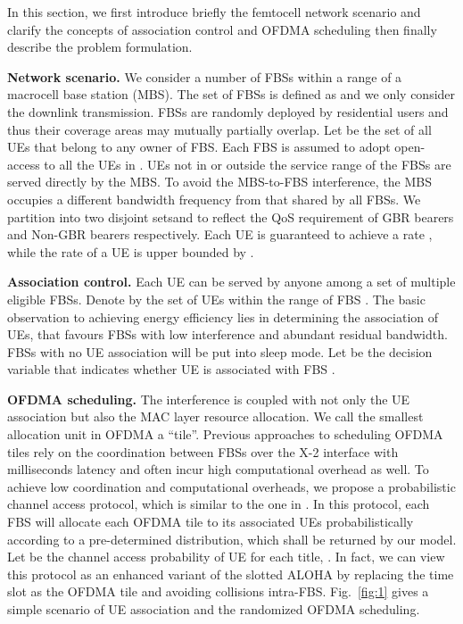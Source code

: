 \documentclass[conference]{IEEEtran}
\begin{document}
In this section, we first introduce briefly the femtocell network scenario and clarify the concepts of association control and OFDMA scheduling then finally describe the problem formulation.

\noindent\textbf{Network scenario.} We consider a number of FBSs within a range of a macrocell base station (MBS). The set of FBSs is defined as  and we only consider the downlink transmission. FBSs are randomly deployed by residential users and thus their coverage areas may mutually partially overlap. Let  be the set of all UEs that belong to any owner of FBS. Each FBS is assumed to adopt open-access to all the UEs in . UEs not in  or outside the service range of the FBSs are served directly by the MBS. To avoid the MBS-to-FBS interference, the MBS occupies a different bandwidth frequency from that shared by all FBSs. We partition  into two disjoint sets\footnotemark  and  to reflect the QoS requirement of GBR bearers and Non-GBR bearers respectively. Each UE  is guaranteed to achieve a rate , while the rate of a UE  is upper bounded by  \cite{sesia2009lte}.


\noindent\textbf{Association control.} Each UE  can be served by anyone among a set of multiple eligible FBSs. Denote by  the set of UEs within the range of FBS . The basic observation to achieving energy efficiency lies in determining the association of UEs, that favours FBSs with low interference and abundant residual bandwidth. FBSs with no UE association will be put into sleep mode. Let  be the decision variable that indicates whether UE  is associated with FBS . 

\noindent\textbf{OFDMA scheduling.} The interference is coupled with not only the UE association but also the MAC layer resource allocation. We call the smallest allocation unit in OFDMA a ``tile''. Previous approaches \cite{hou2013energy} to scheduling OFDMA tiles rely on the coordination between FBSs over the X-2 interface with milliseconds latency and often incur high computational overhead as well. To achieve low coordination and computational overheads, we propose a probabilistic channel access protocol, which is similar to the one in \cite{hou2011proportionally}. In this protocol, each FBS will allocate each OFDMA tile to its associated UEs probabilistically according to a pre-determined distribution, which shall be returned by our model. Let  be the channel access probability of UE  for each title, . In fact, we can view this protocol as an enhanced variant of the slotted ALOHA by replacing the time slot as the OFDMA tile and avoiding collisions intra-FBS. Fig.~\ref{fig:1} gives a simple scenario of UE association and the randomized OFDMA scheduling.
\end{document}
